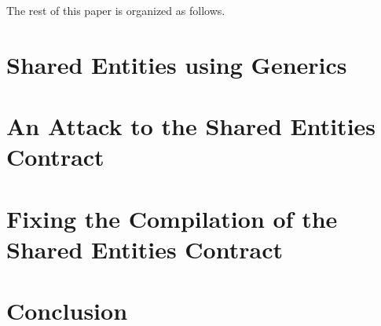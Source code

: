 \documentclass{llncs}
\begin{document}
The rest of this paper is organized as follows.

\section{Shared Entities using Generics}\label{sec:shared_entities}

\section{An Attack to the Shared Entities Contract}\label{sec:attack}

\section{Fixing the Compilation of the Shared Entities Contract} \label{sec:fix}

\section{Conclusion}\label{sec:conclusion} 



\end{document}

